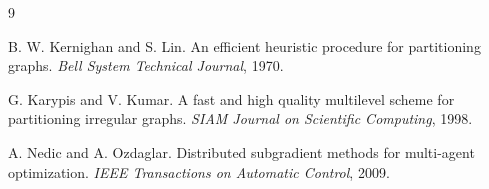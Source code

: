 \documentclass[11pt]{article}
\begin{document}
\begin{thebibliography}{9}

B. W. Kernighan and S. Lin.
\newblock An efficient heuristic procedure for partitioning graphs.
\newblock \emph{Bell System Technical Journal}, 1970.

G. Karypis and V. Kumar.
\newblock A fast and high quality multilevel scheme for partitioning irregular graphs.
\newblock \emph{SIAM Journal on Scientific Computing}, 1998.

A. Nedic and A. Ozdaglar.
\newblock Distributed subgradient methods for multi-agent optimization.
\newblock \emph{IEEE Transactions on Automatic Control}, 2009.

\end{thebibliography}
\end{document}
